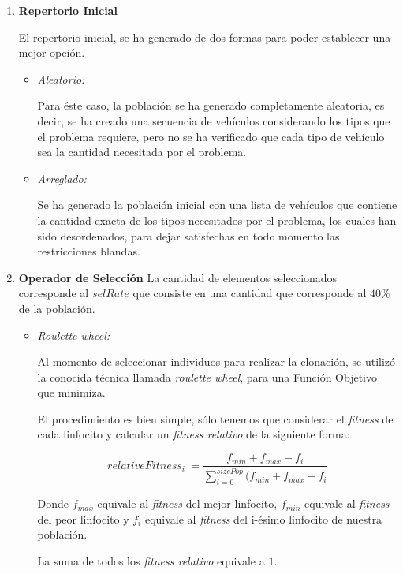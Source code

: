 \begin{enumerate}
	\item \textbf{Repertorio Inicial}

		El repertorio inicial, se ha generado de dos formas para poder establecer una mejor opción.
		\begin{itemize}
			\item \emph{Aleatorio:}
	
				Para éste caso, la población se ha generado completamente aleatoria, es decir,
				se ha creado una secuencia de vehículos considerando los tipos que el problema
				requiere, pero no se ha verificado que cada tipo de vehículo sea la cantidad
				necesitada por el problema.
			\item \emph{Arreglado:} 
				
				Se ha generado la población inicial con una lista de vehículos que contiene
				la cantidad exacta de los tipos necesitados por el problema, los cuales
				han sido desordenados, para dejar satisfechas en todo momento las restricciones
				blandas.
		\end{itemize}

	\item \textbf{Operador de Selección}
		La cantidad de elementos seleccionados corresponde al $selRate$ que consiste en una cantidad que corresponde
		al $40\%$ de la población.

		\begin{itemize}
			\item \emph{Roulette wheel:}
 
				Al momento de seleccionar individuos para realizar la clonación, se utilizó la conocida técnica llamada
				\emph{roulette wheel}, para una Función Objetivo que minimiza.
				
				El procedimiento es bien simple, sólo tenemos que considerar el \emph{fitness} de cada linfocito y calcular un
				\emph{fitness relativo} de la siguiente forma:
				
				$$relativeFitness_{i}\ = \frac{f_{min} + f_{max} - f_{i}}{\sum\limits_{i=0}^{sizePop} (f_{min} + f_{max} - f_{i}}$$
				
				Donde $f_{max}$ equivale al \emph{fitness} del mejor linfocito,
				$f_{min}$ equivale al \emph{fitness} del peor linfocito y
				$f_{i}$ equivale al \emph{fitness} del i-ésimo linfocito de nuestra población.
				
				La suma de todos los \emph{fitness relativo} equivale a $1$.
					

\end{itemize}
\end{enumerate}
